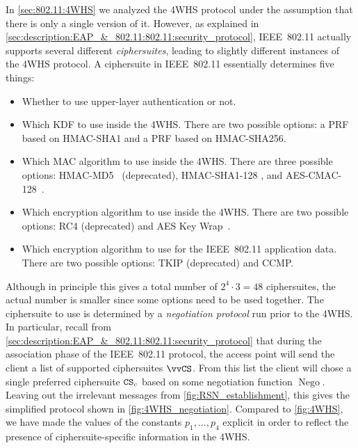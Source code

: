In \cref{sec:802.11:4WHS} we analyzed the 4WHS protocol under the assumption that there is only a single version of it.
However,
as explained in \cref{sec:description:EAP_&_802.11:802.11:security_protocol},
IEEE~802.11 actually supports several different \emph{ciphersuites},
leading to slightly different instances of the 4WHS protocol.
A ciphersuite in IEEE~802.11 essentially determines five things:
\begin{itemize}
	\item Whether to use upper-layer authentication or not.
	
	\item Which KDF to use inside the 4WHS.
	There are two possible options: a PRF based on HMAC-SHA1
	and a PRF based on HMAC-SHA256.
	
	\item Which MAC algorithm to use inside the 4WHS.
	There are three possible options: HMAC-MD5~\cite{IETF:RFC2104:HMAC} (deprecated),
	HMAC-SHA1-128 \cite{IETF:RFC2104:HMAC},
	and AES-CMAC-128~\cite{FIPS:SP-800-38B:CMAC}.
	
	\item Which encryption algorithm to use inside the 4WHS.
	There are two possible options: 
	RC4 (deprecated) and AES Key Wrap~\cite{IETF:RFC3394:AES-key-wrap}.
	
	\item Which encryption algorithm to use for the IEEE~802.11 application data.
	There are two possible options:
	TKIP (deprecated) and CCMP. 
	
\end{itemize}

Although in principle this gives a total number of $2^4 \cdot 3 = 48$ ciphersuites,
the actual number is smaller since some options need to be used together.
The ciphersuite to use is determined by a \emph{negotiation protocol} run prior to the 4WHS.
In particular,
recall from \cref{sec:description:EAP_&_802.11:802.11:security_protocol} that during the association phase of the IEEE~802.11 protocol, the access point will send the client a list of supported ciphersuites $\vcnf$.
From this list the client will chose a single preferred ciphersuite $\mathtt{CS}_c$ based on some negotiation function $\operatorname{Nego}$.
Leaving out the irrelevant messages from \cref{fig:RSN_establishment},
this gives the simplified protocol shown in \cref{fig:4WHS_negotiation}. 
Compared to \cref{fig:4WHS},
we have made the values of the constants $p_1, \dotsc, p_4$ explicit in order to reflect the presence of ciphersuite-specific information in the 4WHS.  

